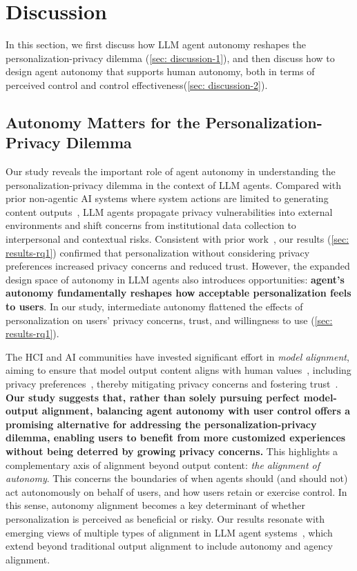 \section{Discussion}

In this section, we first discuss how LLM agent autonomy reshapes the personalization-privacy dilemma (\autoref{sec: discussion-1}), and then discuss how to design agent autonomy that supports human autonomy, both in terms of perceived control and control effectiveness(\autoref{sec: discussion-2}).

\subsection{Autonomy Matters for the Personalization-Privacy Dilemma}
\label{sec: discussion-1}

Our study reveals the important role of agent autonomy in understanding the personalization-privacy dilemma in the context of LLM agents.
Compared with prior non-agentic AI systems where system actions are limited to generating content outputs~\citep{}, LLM agents propagate privacy vulnerabilities into external environments and shift concerns from institutional data collection to interpersonal and contextual risks.
Consistent with prior work~\citep{}, our results (\autoref{sec: results-rq1}) confirmed that personalization without considering privacy preferences increased privacy concerns and reduced trust.
However, the expanded design space of autonomy in LLM agents also introduces opportunities: \textbf{agent's autonomy fundamentally reshapes how acceptable personalization feels to users}.
In our study, intermediate autonomy flattened the effects of personalization on users' privacy concerns, trust, and willingness to use (\autoref{sec: results-rq1}).

The HCI and AI communities have invested significant effort in \textit{model alignment}, aiming to ensure that model output content aligns with human values~\citep{gabriel2020artificial}, including privacy preferences~\citep{shaikh2025creating}, thereby mitigating privacy concerns and fostering trust~\citep{kirk2024benefits, shen2024towards}.
\textbf{Our study suggests that, rather than solely pursuing perfect model-output alignment, balancing agent autonomy with user control offers a promising alternative for addressing the personalization-privacy dilemma, enabling users to benefit from more customized experiences without being deterred by growing privacy concerns.}
This highlights a complementary axis of alignment beyond output content: \textit{the alignment of autonomy}.
This concerns the boundaries of when agents should (and should not) act autonomously on behalf of users, and how users retain or exercise control.
In this sense, autonomy alignment becomes a key determinant of whether personalization is perceived as beneficial or risky. 
Our results resonate with emerging views of multiple types of alignment in LLM agent systems~\citep{goyal2024designing}, which extend beyond traditional output alignment to include autonomy and agency alignment.




